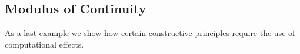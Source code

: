 \subsection{Modulus of Continuity}
\label{sec:we-show-modulus-of-continuity-example}

As a last example we show how certain constructive principles require
the use of computational effects. 



